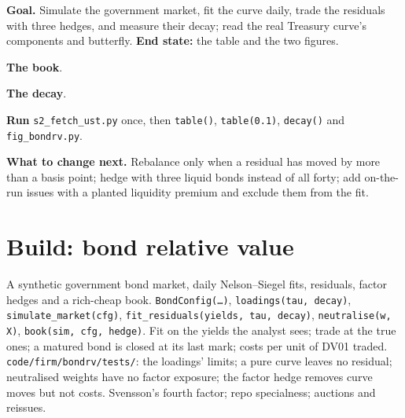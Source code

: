 \begin{tutorial}
\textbf{Goal.} Simulate the government market, fit the curve daily, trade the residuals with three hedges, and measure their decay; read the real
Treasury curve's components and butterfly. \textbf{End state:} the table and the two figures.
\begin{tutsteps}
\item \textbf{The book}.
\label{lst:s2:government-bond-relative-value:book}
\item \textbf{The decay}.
\label{lst:s2:government-bond-relative-value:decay}
\item \textbf{Run} \texttt{s2\_fetch\_ust.py} once, then \texttt{table()}, \texttt{table(0.1)}, \texttt{decay()} and \texttt{fig\_bondrv.py}.
\end{tutsteps}
\textbf{What to change next.} Rebalance only when a residual has moved by more than a basis point; hedge with three liquid bonds instead of all forty;
add on-the-run issues with a planted liquidity premium and exclude them from the fit.
\end{tutorial}

\section{Build: bond relative value}\label{bld:s2:government-bond-relative-value:bondrv}

\begin{build}
 A synthetic government bond market, daily Nelson--Siegel fits, residuals, factor hedges and a rich-cheap book.
 \texttt{BondConfig(\dots)}, \texttt{loadings(tau, decay)}, \texttt{simulate\_market(cfg)}, \texttt{fit\_residuals(yields, tau,
decay)}, \texttt{neutralise(w, X)}, \texttt{book(sim, cfg, hedge)}.
 Fit on the yields the analyst sees; trade at the true ones; a matured bond is closed at its last mark; costs per unit of DV01 traded.
 \texttt{code/firm/bondrv/tests/}: the loadings' limits; a pure curve leaves no residual; neutralised weights have no factor
exposure; the factor hedge removes curve moves but not costs.
 Svensson's fourth factor; repo specialness; auctions and reissues.
\end{build}

